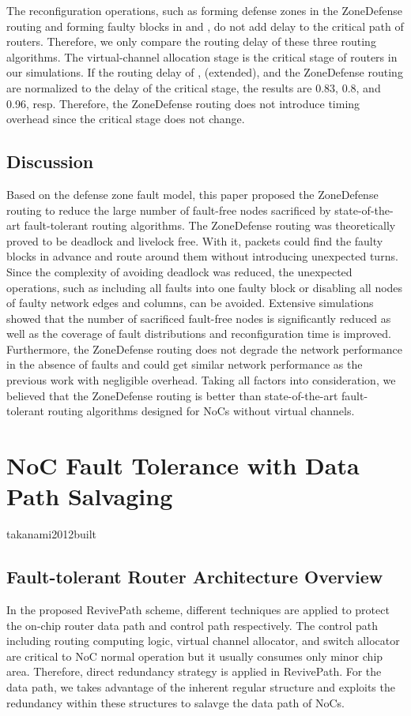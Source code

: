 The reconfiguration operations, such as forming defense zones in the ZoneDefense routing and forming faulty blocks in \cite{wu2003fault} and \cite{zhang2008reconfigurable}, do not add delay to the critical path of routers. Therefore, we only compare the routing delay of these three routing algorithms. The virtual-channel allocation stage is the critical stage of routers in our simulations. If the routing delay of \cite{wu2003fault}, \cite{zhang2008reconfigurable} (extended), and the ZoneDefense routing are normalized to the delay of the critical stage, the results are 0.83, 0.8, and 0.96, resp. Therefore, the ZoneDefense routing does not introduce timing overhead since the critical stage does not change.

\subsection{Discussion}
Based on the defense zone fault model, this paper proposed the ZoneDefense routing to reduce the large number of fault-free nodes sacrificed by state-of-the-art fault-tolerant routing algorithms. The ZoneDefense routing was theoretically proved to be deadlock and livelock free. With it, packets could find the faulty blocks in advance and route around them without introducing unexpected turns. Since the complexity of avoiding deadlock was reduced, the unexpected operations, such as including all faults into one faulty block or disabling all nodes of faulty network edges and columns, can be avoided. Extensive simulations showed that the number of sacrificed fault-free nodes is significantly reduced as well as the coverage of fault distributions and reconfiguration time is improved. Furthermore, the ZoneDefense routing does not degrade the network performance in the absence of faults and could get similar network performance as the previous work with negligible overhead. Taking all factors into consideration, we believed that the ZoneDefense routing is better than state-of-the-art fault-tolerant routing algorithms designed for NoCs without virtual channels.

\section{NoC Fault Tolerance with Data Path Salvaging}

takanami2012built\subsection{Fault-tolerant Router Architecture Overview}
In the proposed RevivePath scheme, different techniques are applied to protect the on-chip router data path and control path respectively. The control path including routing computing logic, virtual channel allocator, and switch allocator are critical to NoC normal operation but it usually consumes only minor chip area. Therefore, direct redundancy strategy is applied in RevivePath. For the data path, we takes advantage of the inherent regular structure and exploits the redundancy within these structures to salavge the data path of NoCs.

